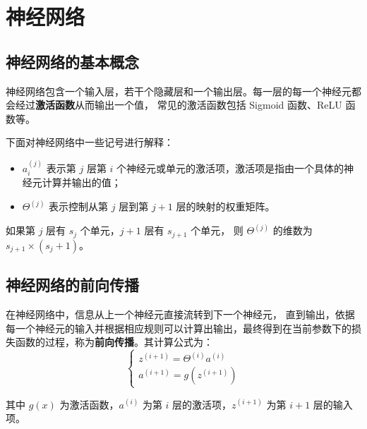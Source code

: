 \section{神经网络}
\subsection{神经网络的基本概念}
神经网络包含一个输入层，若干个隐藏层和一个输出层。每一层的每一个神经元都会经过\textbf{激活函数}从而输出一个值，
常见的激活函数包括 Sigmoid 函数、ReLU 函数等。

下面对神经网络中一些记号进行解释：
\begin{itemize}
    \item $a_i^{(j)}$ 表示第 $j$ 层第 $i$ 个神经元或单元的激活项，激活项是指由一个具体的神经元计算并输出的值；
    \item $\Theta^{(j)}$ 表示控制从第 $j$ 层到第 $j+1$ 层的映射的权重矩阵。
\end{itemize}

如果第 $j$ 层有 $s_j$ 个单元，$j+1$ 层有 $s_{j+1}$ 个单元，
则 $\Theta^{(j)}$ 的维数为 $s_{j+1} \times (s_j + 1)$。

\subsection{神经网络的前向传播}
在神经网络中，信息从上一个神经元直接流转到下一个神经元，
直到输出，依据每一个神经元的输入并根据相应规则可以计算出输出，最终得到在当前参数下的损失函数的过程，称为\textbf{前向传播}。其计算公式为：
\begin{equation}
    \begin{cases}z^{(i+1)} = \Theta^{(i)}a^{(i)} \\ a^{(i+1)} = g\left(z^{(i+1)}\right)\end{cases}
\end{equation}
    
其中 $g(x)$ 为激活函数，$a^{(i)}$ 为第 $i$ 层的激活项，$z^{(i+1)}$ 为第 $i+1$ 层的输入项。

